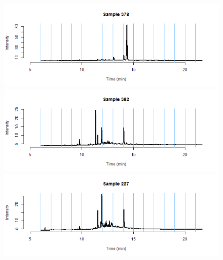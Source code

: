 \documentclass[11pt]{article}
\theoremstyle{plain}
\theoremstyle{definition}
\begin{document}
\begin{figure}[H]
\begin{center}
\includegraphics[trim ={3.5cm 2.7cm 2cm 2cm},scale=.6, clip=true]{BinPlotDMC_22.png}
\includegraphics[trim ={3.5cm 2.7cm 2cm 2cm},scale=.6, clip=true]{BinPlotDMC_23.png}
\includegraphics[trim ={3.5cm 2.7cm 2cm 2cm},scale=.6, clip=true]{BinPlotDMC_24.png}
\end{center}
\end{figure}
\end{document}

